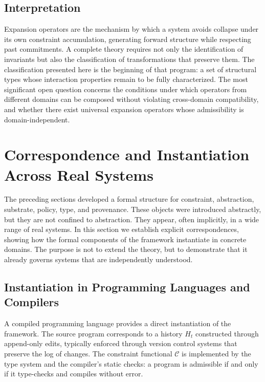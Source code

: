 \documentclass[12pt, a4paper]{article}
\theoremstyle{plain}
\theoremstyle{definition}
\theoremstyle{remark}
\begin{document}
\subsection{Interpretation}

Expansion operators are the mechanism by which a system avoids collapse under its own constraint accumulation, generating forward structure while respecting past commitments. A complete theory requires not only the identification of invariants but also the classification of transformations that preserve them. The classification presented here is the beginning of that program: a set of structural types whose interaction properties remain to be fully characterized. The most significant open question concerns the conditions under which operators from different domains can be composed without violating cross-domain compatibility, and whether there exist universal expansion operators whose admissibility is domain-independent.

\section{Correspondence and Instantiation Across Real Systems}

The preceding sections developed a formal structure for constraint, abstraction, substrate, policy, type, and provenance. These objects were introduced abstractly, but they are not confined to abstraction. They appear, often implicitly, in a wide range of real systems. In this section we establish explicit correspondences, showing how the formal components of the framework instantiate in concrete domains. The purpose is not to extend the theory, but to demonstrate that it already governs systems that are independently understood.

\subsection{Instantiation in Programming Languages and Compilers}

A compiled programming language provides a direct instantiation of the framework. The source program corresponds to a history $H_t$ constructed through append-only edits, typically enforced through version control systems that preserve the log of changes. The constraint functional $\mathcal{C}$ is implemented by the type system and the compiler's static checks: a program is admissible if and only if it type-checks and compiles without error.
\end{document}
